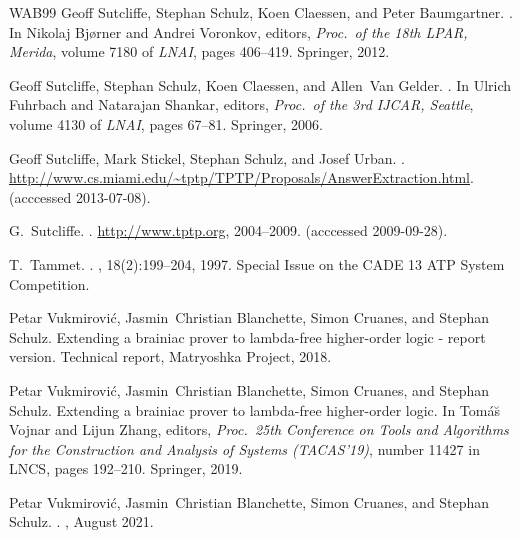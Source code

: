\documentclass{report}
\begin{document}
\begin{thebibliography}{WAB{\etalchar{+}}99}
Geoff Sutcliffe, Stephan Schulz, Koen Claessen, and Peter Baumgartner.
.
\newblock In Nikolaj Bj{\o}rner and Andrei Voronkov, editors, {\em Proc.\ of
  the 18th LPAR, Merida}, volume 7180 of {\em LNAI}, pages 406--419. Springer,
  2012.

Geoff Sutcliffe, Stephan Schulz, Koen Claessen, and Allen~Van Gelder.
.
\newblock In Ulrich Fuhrbach and Natarajan Shankar, editors, {\em Proc.\ of the
  3rd IJCAR, Seattle}, volume 4130 of {\em LNAI}, pages 67--81. Springer, 2006.

Geoff Sutcliffe, Mark Stickel, Stephan Schulz, and Josef Urban.
.
\newblock
  \url{http://www.cs.miami.edu/~tptp/TPTP/Proposals/AnswerExtraction.html}.
\newblock (acccessed 2013-07-08).

G.~Sutcliffe.
.
\newblock \url{http://www.tptp.org}, 2004--2009.
\newblock (acccessed 2009-09-28).

T.~Tammet.
.
, 18(2):199--204, 1997.
\newblock Special Issue on the CADE 13 ATP System Competition.

Petar Vukmirovi{\'c}, Jasmin~Christian Blanchette, Simon Cruanes, and Stephan
  Schulz.
\newblock Extending a brainiac prover to lambda-free higher-order logic -
  report version.
\newblock Technical report, Matryoshka Project, 2018.

Petar Vukmirovi{\'c}, Jasmin~Christian Blanchette, Simon Cruanes, and Stephan
  Schulz.
\newblock Extending a brainiac prover to lambda-free higher-order logic.
\newblock In Tom{\'a}{\u s} Vojnar and Lijun Zhang, editors, {\em Proc.\ 25th
  Conference on Tools and Algorithms for the Construction and Analysis of
  Systems (TACAS'19)}, number 11427 in LNCS, pages 192--210. Springer, 2019.

Petar Vukmirovi{\'c}, Jasmin~Christian Blanchette, Simon Cruanes, and Stephan
  Schulz.
.
, August 2021.


\end{thebibliography}
\end{document}

